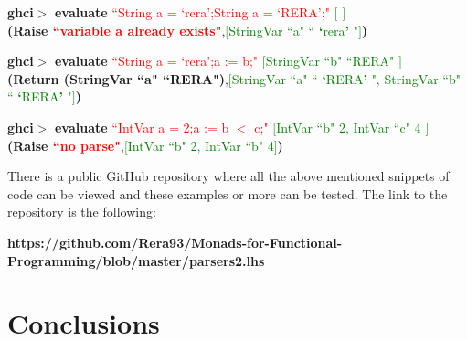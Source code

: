 \documentclass[a4paper, onecolumn]{article}
\begin{document}
         \begin{center}
            \textbf{ghci$>$} \textbf{evaluate} \textcolor{red}{``String a = `rera';String a = `RERA';"} \textcolor{green}{ $\big[$ $\big]$} \\
             \textbf{(Raise \textcolor{red}{``variable a already exists"}},\textcolor{green}{$\big[$StringVar ``a" `` \textbf{`}rera\textbf{'} "$\big]$}\textbf{)}
        \end{center}
    
    \begin{center}
            \textbf{ghci$>$} \textbf{evaluate} \textcolor{red}{``String a = `rera';a := b;"} \textcolor{green}{ $\big[$StringVar ``b" ``RERA" $\big]$} \\
             \textbf{(Return (StringVar ``a" ``RERA")},\textcolor{green}{$\big[$StringVar ``a" `` \textbf{`}RERA\textbf{'} ", StringVar ``b" `` \textbf{`}RERA\textbf{'} "$\big]$}\textbf{)}
        \end{center}
        
        \begin{center}
            \textbf{ghci$>$} \textbf{evaluate} \textcolor{red}{``IntVar a = 2;a := b $<$ c;"} \textcolor{green}{ $\big[$IntVar ``b" 2, IntVar ``c" 4 $\big]$} \\
             \textbf{(Raise \textcolor{red}{``no parse"}},\textcolor{green}{$\big[$IntVar ``b" 2, IntVar ``b" 4$\big]$}\textbf{)}
        \end{center}
        
    \noindent There is a public GitHub repository where all the above mentioned snippets of code can be viewed and these examples or more can be tested. The link to the repository is the following:
    \begin{center}
        \textbf{https://github.com/Rera93/Monads-for-Functional-Programming/blob/master/parsers2.lhs}
    \end{center}
    
    \section{Conclusions}
    
    
    
    
    
\end{document}
